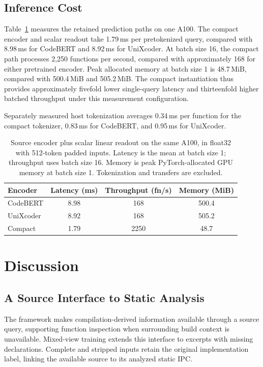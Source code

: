 \documentclass[conference]{IEEEtran}
\begin{document}
\subsection{Inference Cost}
\label{sec:cost}
Table~\ref{tab:cost} measures the retained prediction paths on one A100. The compact encoder and scalar readout take 1.79\,ms per pretokenized query, compared with 8.98\,ms for CodeBERT and 8.92\,ms for UniXcoder. At batch size 16, the compact path processes 2,250 functions per second, compared with approximately 168 for either pretrained encoder. Peak allocated memory at batch size 1 is 48.7\,MiB, compared with 500.4\,MiB and 505.2\,MiB. The compact instantiation thus provides approximately fivefold lower single-query latency and thirteenfold higher batched throughput under this measurement configuration.

Separately measured host tokenization averages 0.34\,ms per function for the compact tokenizer, 0.83\,ms for CodeBERT, and 0.95\,ms for UniXcoder.

\begin{table}[t]
\caption{Source encoder plus scalar linear readout on the same A100, in float32 with 512-token padded inputs. Latency is the mean at batch size 1; throughput uses batch size 16. Memory is peak PyTorch-allocated GPU memory at batch size 1. Tokenization and transfers are excluded.}
\label{tab:cost}
\centering\small
\setlength{\tabcolsep}{3pt}
\begin{tabular}{lccc}
\toprule
Encoder & Latency (ms) & Throughput (fn/s) & Memory (MiB)\\
\midrule
CodeBERT & 8.98 & 168 & 500.4\\
UniXcoder & 8.92 & 168 & 505.2\\
Compact & 1.79 & 2250 & 48.7\\
\bottomrule
\end{tabular}
\end{table}

\section{Discussion}
\subsection{A Source Interface to Static Analysis}
The framework makes compilation-derived information available through a source query, supporting function inspection when surrounding build context is unavailable. Mixed-view training extends this interface to excerpts with missing declarations. Complete and stripped inputs retain the original implementation label, linking the available source to its analyzed static IPC.
\end{document}
